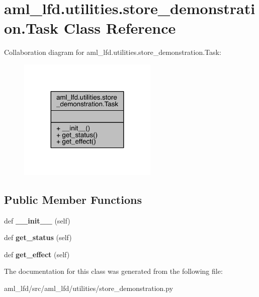 \hypertarget{classaml__lfd_1_1utilities_1_1store__demonstration_1_1_task}{}\section{aml\+\_\+lfd.\+utilities.\+store\+\_\+demonstration.\+Task Class Reference}
\label{classaml__lfd_1_1utilities_1_1store__demonstration_1_1_task}


Collaboration diagram for aml\+\_\+lfd.\+utilities.\+store\+\_\+demonstration.\+Task\+:
\nopagebreak
\begin{figure}[H]
\begin{center}
\leavevmode
\includegraphics[width=188pt]{classaml__lfd_1_1utilities_1_1store__demonstration_1_1_task__coll__graph}
\end{center}
\end{figure}
\subsection*{Public Member Functions}
\begin{DoxyCompactItemize}
\item 
\hypertarget{classaml__lfd_1_1utilities_1_1store__demonstration_1_1_task_a4ce3ad6f8e2d3d6480e835314952b1a1}{}\label{classaml__lfd_1_1utilities_1_1store__demonstration_1_1_task_a4ce3ad6f8e2d3d6480e835314952b1a1} 
def {\bfseries \+\_\+\+\_\+init\+\_\+\+\_\+} (self)
\item 
\hypertarget{classaml__lfd_1_1utilities_1_1store__demonstration_1_1_task_abba6e694b00e75fa26daf543d1a5ab20}{}\label{classaml__lfd_1_1utilities_1_1store__demonstration_1_1_task_abba6e694b00e75fa26daf543d1a5ab20} 
def {\bfseries get\+\_\+status} (self)
\item 
\hypertarget{classaml__lfd_1_1utilities_1_1store__demonstration_1_1_task_a48e41283ac81edf9025dd9845ef90009}{}\label{classaml__lfd_1_1utilities_1_1store__demonstration_1_1_task_a48e41283ac81edf9025dd9845ef90009} 
def {\bfseries get\+\_\+effect} (self)
\end{DoxyCompactItemize}


The documentation for this class was generated from the following file\+:\begin{DoxyCompactItemize}
\item 
aml\+\_\+lfd/src/aml\+\_\+lfd/utilities/store\+\_\+demonstration.\+py\end{DoxyCompactItemize}
